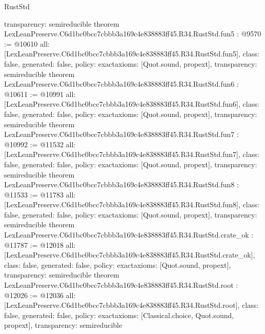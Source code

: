 \begin{lexlean}{RustStd}
\begin{coremodule}
{  transparency: semireducible
}
theorem LexLeanPreserve.C6d1bc0bcc7cbbb3a169c4e838883ff45.R34.RustStd.fun5 : @9570 := @10610 {
  all: [LexLeanPreserve.C6d1bc0bcc7cbbb3a169c4e838883ff45.R34.RustStd.fun5],
  class: false,
  generated: false,
  policy: exact{axioms: [Quot.sound, propext]},
  transparency: semireducible
}
theorem LexLeanPreserve.C6d1bc0bcc7cbbb3a169c4e838883ff45.R34.RustStd.fun6 : @10611 := @10991 {
  all: [LexLeanPreserve.C6d1bc0bcc7cbbb3a169c4e838883ff45.R34.RustStd.fun6],
  class: false,
  generated: false,
  policy: exact{axioms: [Quot.sound, propext]},
  transparency: semireducible
}
theorem LexLeanPreserve.C6d1bc0bcc7cbbb3a169c4e838883ff45.R34.RustStd.fun7 : @10992 := @11532 {
  all: [LexLeanPreserve.C6d1bc0bcc7cbbb3a169c4e838883ff45.R34.RustStd.fun7],
  class: false,
  generated: false,
  policy: exact{axioms: [Quot.sound, propext]},
  transparency: semireducible
}
theorem LexLeanPreserve.C6d1bc0bcc7cbbb3a169c4e838883ff45.R34.RustStd.fun8 : @11533 := @11783 {
  all: [LexLeanPreserve.C6d1bc0bcc7cbbb3a169c4e838883ff45.R34.RustStd.fun8],
  class: false,
  generated: false,
  policy: exact{axioms: [Quot.sound, propext]},
  transparency: semireducible
}
theorem LexLeanPreserve.C6d1bc0bcc7cbbb3a169c4e838883ff45.R34.RustStd.crate_ok : @11787 := @12018 {
  all: [LexLeanPreserve.C6d1bc0bcc7cbbb3a169c4e838883ff45.R34.RustStd.crate_ok],
  class: false,
  generated: false,
  policy: exact{axioms: [Quot.sound, propext]},
  transparency: semireducible
}
theorem LexLeanPreserve.C6d1bc0bcc7cbbb3a169c4e838883ff45.R34.RustStd.root : @12026 := @12036 {
  all: [LexLeanPreserve.C6d1bc0bcc7cbbb3a169c4e838883ff45.R34.RustStd.root],
  class: false,
  generated: false,
  policy: exact{axioms: [Classical.choice, Quot.sound, propext]},
  transparency: semireducible
}


\end{coremodule}
\end{lexlean}
